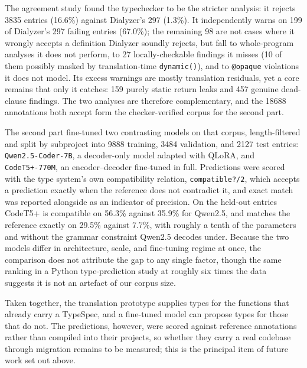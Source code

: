 The agreement study found the typechecker to be the stricter analysis: it rejects \num{3835} entries (16.6\%) against Dialyzer's 297 (1.3\%).
It independently warns on 199 of Dialyzer's 297 failing entries (67.0\%); the remaining 98 are not cases where it wrongly accepts a definition Dialyzer soundly rejects, but fall to whole-program analyses it does not perform, to 27 locally-checkable findings it misses (10 of them possibly masked by translation-time \texttt{dynamic()}), and to \texttt{@opaque} violations it does not model.
Its excess warnings are mostly translation residuals, yet a core remains that only it catches: 159 purely static return leaks and 457 genuine dead-clause findings.
The two analyses are therefore complementary, and the \num{18688} annotations both accept form the checker-verified corpus for the second part.

The second part fine-tuned two contrasting models on that corpus, length-filtered and split by subproject into \num{9888} training, \num{3484} validation, and \num{2127} test entries: \texttt{Qwen2.5-Coder-7B}, a decoder-only model adapted with QLoRA, and \texttt{CodeT5+-770M}, an encoder--decoder fine-tuned in full.
Predictions were scored with the type system's own compatibility relation, \texttt{compatible?/2}, which accepts a prediction exactly when the reference does not contradict it, and exact match was reported alongside as an indicator of precision.
On the held-out entries CodeT5+ is compatible on 56.3\% against 35.9\% for Qwen2.5, and matches the reference exactly on 29.5\% against 7.7\%, with roughly a tenth of the parameters and without the grammar constraint Qwen2.5 decodes under.
Because the two models differ in architecture, scale, and fine-tuning regime at once, the comparison does not attribute the gap to any single factor, though the same ranking in a Python type-prediction study at roughly six times the data~\cite{Nina} suggests it is not an artefact of our corpus size.

Taken together, the translation prototype supplies types for the functions that already carry a TypeSpec, and a fine-tuned model can propose types for those that do not.
The predictions, however, were scored against reference annotations rather than compiled into their projects, so whether they carry a real codebase through migration remains to be measured; this is the principal item of future work set out above.
